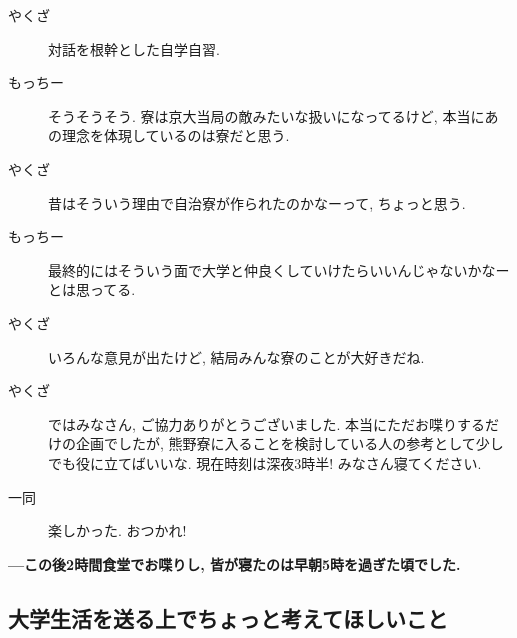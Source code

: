 \documentclass[10pt,b5jsbook,dvips,dvipdfmx,openany]{jsbook}
\theoremstyle{definition}
\begin{document}
\begin{multicols}{2}
\begin{description}
		\item[やくざ]対話を根幹とした自学自習. 
		\item[もっちー]そうそうそう. 寮は京大当局の敵みたいな扱いになってるけど, 本当にあの理念を体現しているのは寮だと思う. 
		\item[やくざ]昔はそういう理由で自治寮が作られたのかなーって, ちょっと思う. 
		\item[もっちー]最終的にはそういう面で大学と仲良くしていけたらいいんじゃないかなーとは思ってる. 
		\item[やくざ]いろんな意見が出たけど, 結局みんな寮のことが大好きだね. 
		\item[やくざ]ではみなさん, ご協力ありがとうございました. 本当にただお喋りするだけの企画でしたが, 熊野寮に入ることを検討している人の参考として少しでも役に立てばいいな. 現在時刻は深夜3時半! みなさん寝てください. 
		\item[ 一同 ]楽しかった. おつかれ! 
		\end{description}
		\textbf{---この後2時間食堂でお喋りし, 皆が寝たのは早朝5時を過ぎた頃でした. }

\end{multicols}
\normalsize
		\subsection{大学生活を送る上でちょっと考えてほしいこと}
\end{document}
